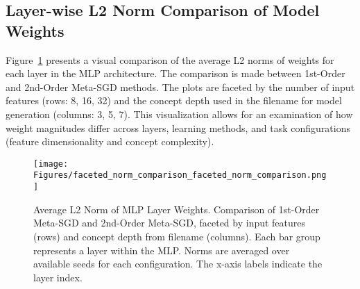 \documentclass{article}
\begin{document}
\subsection{Layer-wise L2 Norm Comparison of Model Weights}\label{app:layer_weight_norms_faceted}
Figure~\ref{fig:layer_norms_faceted} presents a visual comparison of the average L2 norms of weights for each layer in the MLP architecture. The comparison is made between 1st-Order and 2nd-Order Meta-SGD methods. The plots are faceted by the number of input features (rows: 8, 16, 32) and the concept depth used in the filename for model generation (columns: 3, 5, 7). This visualization allows for an examination of how weight magnitudes differ across layers, learning methods, and task configurations (feature dimensionality and concept complexity). 

\begin{figure}[H]
    \centering
    \texttt{[image: Figures/faceted\_norm\_comparison\_faceted\_norm\_comparison.png]} 
    \caption{Average L2 Norm of MLP Layer Weights. Comparison of 1st-Order Meta-SGD and 2nd-Order Meta-SGD, faceted by input features (rows) and concept depth from filename (columns). Each bar group represents a layer within the MLP. Norms are averaged over available seeds for each configuration. The x-axis labels indicate the layer index. }
    \label{fig:layer_norms_faceted}
\end{figure}
\end{document}
